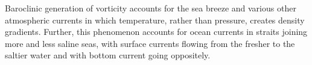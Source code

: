 Baroclinic generation of vorticity accounts for the sea breeze and various other atmospheric currents in which temperature, rather than pressure, creates density gradients. Further, this phenomenon accounts for ocean currents in straits joining more and less saline seas, with surface currents flowing from the fresher to the saltier water and with bottom current going oppositely.

%
%
%
	\newcommand*{\boldomega}{\ifpdftex\mathord{\bm{\omega}}\else\mathord{\symbfup{\omega}}\fi} %
%
\begin{nomenclature*}
\entry{$\boldomega$}{vorticity [$\textrm{s}^{-1}$]} 
\end{nomenclature*}


